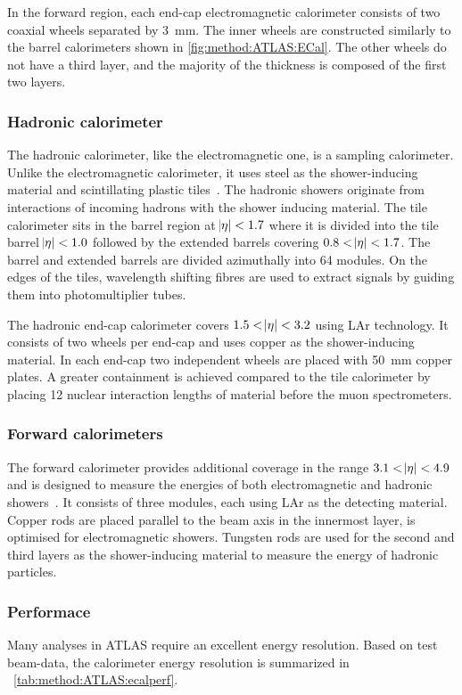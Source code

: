 In the forward region, each end-cap electromagnetic calorimeter consists of two coaxial wheels separated by \SI{3}{mm}. The inner wheels are constructed similarly to the barrel calorimeters shown in \cref{fig:method:ATLAS:ECal}. The other wheels do not have a third layer, and the majority of the thickness is composed of the first two layers. 

\subsubsection{Hadronic calorimeter}
The hadronic calorimeter, like the electromagnetic one, is a sampling calorimeter. Unlike the electromagnetic calorimeter, it uses steel as the shower-inducing material and scintillating plastic tiles~\cite{ATLAS:tile-TDR}. The hadronic showers originate from interactions of incoming hadrons with the shower inducing material. The tile calorimeter sits in the barrel region at $\abs{\eta} < 1.7$ where it is divided into the tile barrel $\abs{\eta} < 1.0$ followed by the extended barrels covering $ 0.8 < \abs{\eta} < 1.7 $. The barrel and extended barrels are divided azimuthally into 64 modules. On the edges of the tiles, wavelength shifting fibres are used to extract signals by guiding them into photomultiplier tubes. 

The hadronic end-cap calorimeter covers $1.5 < \abs{\eta} < 3.2$ using LAr technology. It consists of two wheels per end-cap and uses copper as the shower-inducing material. In each end-cap two independent wheels are placed with \SI{50}{\milli\meter} copper plates. A greater containment is achieved compared to the tile calorimeter by placing 12 nuclear interaction lengths of material before the muon spectrometers. 

\subsubsection{Forward calorimeters}
The forward calorimeter provides additional coverage in the range $3.1 < \abs{\eta} < 4.9$ and is designed to measure the energies of both electromagnetic and hadronic showers~\cite{ATLAS:LAr-TDR}. It consists of three modules, each using LAr as the detecting material. Copper rods are placed parallel to the beam axis in the innermost layer, is optimised for electromagnetic showers. Tungsten rods are used for the second and third layers as the shower-inducing material to measure the energy of hadronic particles. 

\subsubsection{Performace}
Many analyses in ATLAS require an excellent energy resolution. Based on test beam-data, the calorimeter energy resolution is summarized in ~\cref{tab:method:ATLAS:ecalperf}.

